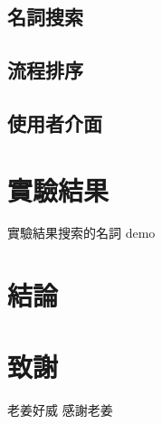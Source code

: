 \documentclass[twocolumn]{article}
\begin{document}
\subsection{名詞搜索}


\subsection{流程排序}

\subsection{使用者介面}

\section{實驗結果}

實驗結果搜索的名詞 demo

\section{結論}

\section{致謝}
老姜好威 感謝老姜
\end{document}
